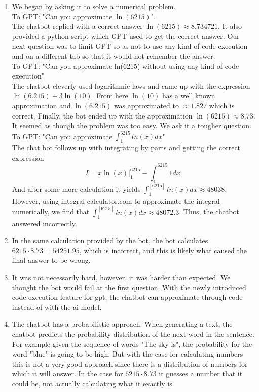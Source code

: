 \documentclass[a4paper]{article}
\newcommand{\enuma}[1]{\begin{enumerate}[labelsep=0.3cm,labelindent=0pt,itemindent=0em,labelwidth=\widthof{\ref{last-item}}, label=(\alph*)]#1 \end{enumerate}}
\begin{document}
\enuma {
\item We began by asking it to solve a numerical problem.\\
To GPT: "Can you approximate $\ln(6215)$".\\
The chatbot replied with a correct answer $\ln(6215)\approx 8.734721$. It also provided a python script which GPT used to get the correct answer.
Our next question was to limit GPT so as not to use any kind of code execution and on a different tab so that it would not remember the answer.\\
To GPT: "Can you approximate ln(6215) without using any kind of code execution"\\
The chatbot cleverly used logarithmic laws and came up with the expression $\ln(6.215)+3\ln(10)$. From here $\ln(10)$ has a well known approximation and $\ln(6.215)$ was approximated to $\approx 1.827$ which is correct. Finally, the bot ended up with the approximation $\ln(6215)\approx 8.73$.\\
It seemed as though the problem was too easy. We ask it a tougher question.\\
To GPT: "Can you approximate $\int_1^{6215} ln(x)dx$"\\
The chat bot follows up with integrating by parts and getting the correct expression
$$I=x\ln(x)\Big\vert_1^{6215}-\int_1^{6215}1dx.$$
And after some more calculation it yields
$\int_1^[6215]ln(x)dx\approx 48038$. However, using integral-calculator.com to approximate the integral numerically, we find that $\int_1^[6215]ln(x)dx\approx 48072.3$.
Thus, the chatbot answered incorrectly.
\item In the same calculation provided by the bot, the bot calculates $6215\cdot8.73=54251.95$, which is incorrect, and this is likely what caused the final answer to be wrong. 
\item It was not necessarily hard, however, it was harder than expected. We thought the bot would fail at the first question. With the newly introduced code execution feature for gpt, the chatbot can approximate through code instead of with the ai model. 
\item The chatbot has a probabilistic approach. When generating a text, the chatbot predicts the probability distribution of the next word in the sentence. For example given the sequence of words "The sky is", the probability for the word "blue" is going to be high. But with the case for calculating numbers this is not a very good approach since there is a distribution of numbers for which it will answer. In the case for $6215\cdot8.73$ it guesses a number that it could be, not actually calculating what it exactly is.
}
\end{document}
